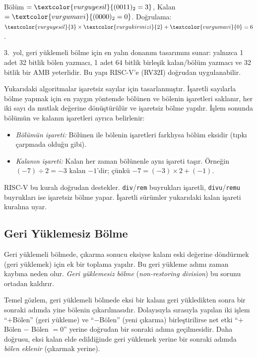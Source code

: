 \begin{ornek}[5.12]
Bölüm $= \textcolor{vurguyesil}{(0011)_2 = 3}$, \quad Kalan $= \textcolor{vurgumavi}{(0000)_2 = 0}$. Doğrulama: $\textcolor{vurguyesil}{3} \times \textcolor{vurgukirmizi}{2} + \textcolor{vurgumavi}{0} = 6$. \checkmark
\end{ornek}

3.\ yol, geri yüklemeli bölme için en yalın donanım tasarımını sunar: yalnızca 1 adet 32 bitlik bölen yazmacı, 1 adet 64 bitlik birleşik kalan/bölüm yazmacı ve 32 bitlik bir AMB yeterlidir. Bu yapı RISC-V'e (RV32I) doğrudan uygulanabilir.

\begin{bilginot}
Yukarıdaki algoritmalar işaretsiz sayılar için tasarlanmıştır. İşaretli sayılarla bölme yapmak için en yaygın yöntemde bölünen ve bölenin işaretleri saklanır, her iki sayı da mutlak değerine dönüştürülür ve işaretsiz bölme yapılır. İşlem sonunda bölümün ve kalanın işaretleri ayrıca belirlenir:
\begin{itemize}[nosep]
  \item \emph{Bölümün işareti:} Bölünen ile bölenin işaretleri farklıysa bölüm eksidir (tıpkı çarpmada olduğu gibi).
  \item \emph{Kalanın işareti:} Kalan her zaman bölünenle aynı işareti taşır. Örneğin $(-7) \div 2 = -3$ kalan $-1$'dir; çünkü $-7 = (-3) \times 2 + (-1)$.
\end{itemize}
RISC-V bu kuralı doğrudan destekler. \texttt{div}/\texttt{rem} buyrukları işaretli, \texttt{divu}/\texttt{remu} buyrukları ise işaretsiz bölme yapar. İşaretli sürümler yukarıdaki kalan işareti kuralına uyar.
\end{bilginot}

\subsection{Geri Yüklemesiz Bölme}
\label{sec:geri-yuklemesiz-bolme}

Geri yüklemeli bölmede, çıkarma sonucu eksiyse kalanı eski değerine döndürmek (geri yüklemek) için ek bir toplama yapılır. Bu geri yükleme adımı zaman kaybına neden olur. \emph{Geri yüklemesiz bölme} (\emph{non-restoring division}) bu sorunu ortadan kaldırır.

Temel gözlem, geri yüklemeli bölmede eksi bir kalanı geri yükledikten sonra bir sonraki adımda yine bölenin çıkarılmasıdır. Dolayısıyla sırasıyla yapılan iki işlem ``$+$Bölen'' (geri yükleme) ve ``$-$Bölen'' (yeni çıkarma) birleştirilirse net etki ``$+$Bölen $-$ Bölen $= 0$'' yerine doğrudan bir sonraki adıma geçilmesidir. Daha doğrusu, eksi kalan elde edildiğinde geri yüklemek yerine bir sonraki adımda \emph{bölen eklenir} (çıkarmak yerine).

